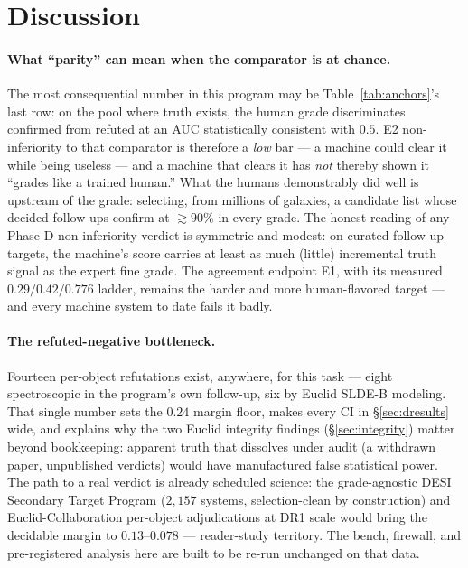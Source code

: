 \documentclass[11pt,letterpaper]{article}
\begin{document}
\section{Discussion}\label{sec:discussion}

\paragraph{What ``parity'' can mean when the comparator is at chance.} The most
consequential number in this program may be Table~\ref{tab:anchors}'s last row: on the
pool where truth exists, the human grade discriminates confirmed from refuted at an AUC
statistically consistent with $0.5$. E2 non-inferiority to that comparator is
therefore a \emph{low} bar --- a machine could clear it while being useless --- and a
machine that clears it has \emph{not} thereby shown it ``grades like a trained human.''
What the humans demonstrably did well is upstream of the grade: selecting, from
millions of galaxies, a candidate list whose decided follow-ups confirm at
${\gtrsim}90\%$ in every grade. The honest reading of any Phase D non-inferiority
verdict is symmetric and modest: on curated follow-up targets, the machine's score
carries at least as much (little) incremental truth signal as the expert fine grade.
The agreement endpoint E1, with its measured $0.29/0.42/0.776$ ladder, remains the
harder and more human-flavored target --- and every machine system to date fails it
badly.

\paragraph{The refuted-negative bottleneck.} Fourteen per-object refutations exist,
anywhere, for this task --- eight spectroscopic in the program's own follow-up, six by
Euclid SLDE-B modeling. That single number sets the $0.24$ margin floor, makes every
CI in \S\ref{sec:dresults} wide, and explains why the two Euclid integrity findings
(\S\ref{sec:integrity}) matter beyond bookkeeping: apparent truth that dissolves under
audit (a withdrawn paper, unpublished verdicts) would have manufactured false
statistical power. The path to a real verdict is already scheduled science: the
grade-agnostic DESI Secondary Target Program ($2{,}157$ systems, selection-clean by
construction) and Euclid-Collaboration per-object adjudications at DR1 scale would
bring the decidable margin to $0.13$--$0.078$ --- reader-study territory. The bench,
firewall, and pre-registered analysis here are built to be re-run unchanged on that
data.
\end{document}
